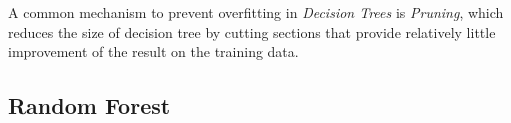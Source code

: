 A common mechanism to prevent overfitting in \emph{Decision Trees} is \emph{Pruning}, which reduces the size of decision tree by cutting sections that provide relatively little improvement of the result on the training data.

\subsection{Random Forest}
\label{subsec:randomforest}

